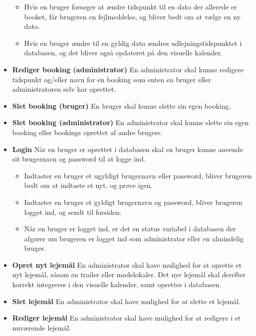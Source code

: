 \documentclass[12pt,a4paper]{report} %
\begin{document}
\begin{itemize}
        \begin{itemize}
            \item Hvis en bruger forsøger at ændre tidspunkt til en dato der allerede er booket, får brugeren en fejlmeddelse, og bliver bedt om at vælge en ny dato. 
            \item Hvis en bruger ændre til en gyldig dato ændres udlejningstidspunktet i databasen, og det bliver også opdateret på den visuelle kalender. 
        \end{itemize}
        \item \textbf{Rediger booking (administrator)\newline}
        En administrator skal kunne redigere tidspunkt og/eller navn for en booking som enten en bruger eller administratoren selv har oprettet.
        \item \textbf{Slet booking (bruger)\newline}
        En bruger skal kunne slette sin egen booking.
        \item \textbf{Slet booking (administrator) \newline}
        En administrator skal kunne slette sin egen booking eller bookings oprettet af andre brugere.
        \item \textbf{Login\newline}
        Når en bruger er oprettet i databasen skal en bruger kunne anvende sit brugernavn og password til at logge ind.
        \begin{itemize}
            \item Indtaster en bruger et ugyldigt brugernavn eller password, bliver brugeren bedt om at indtaste et nyt, og prøve igen.
            \item Indtaster en bruger et gyldigt brugernavn og password, bliver brugeren logget ind, og sendt til forsiden. 
            \item Når en bruger er logget ind, er det en status variabel i databasen der afgører om brugeren er logget ind som administrator eller en almindelig bruger. 
        \end{itemize}
        \item \textbf{Opret nyt lejemål\newline}
        En administrator skal have mulighed for at oprette et nyt lejemål, såsom en trailer eller mødelokaler. Det nye lejemål skal derefter korrekt integreres i den visuelle kalender, samt oprettes i databasen.  
        \item \textbf{Slet lejemål\newline}
        En administrator skal have mulighed for at slette et lejemål.
        \item \textbf{Rediger lejemål\newline}
        En administrator skal have mulighed for at redigere i et nuværende lejemål.
        \end{itemize}
      
\end{document}
